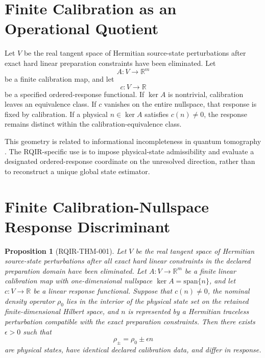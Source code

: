 \documentclass[11pt]{article}
\newtheorem{proposition}{Proposition}
\begin{document}
\section{Finite Calibration as an Operational Quotient}

Let $V$ be the real tangent space of Hermitian source-state perturbations after exact hard linear preparation constraints have been eliminated. Let
\begin{equation}
 A:V\rightarrow\mathbb R^m
\end{equation}
be a finite calibration map, and let
\begin{equation}
 c:V\rightarrow\mathbb R
\end{equation}
be a specified ordered-response functional. If $\ker A$ is nontrivial, calibration leaves an equivalence class. If $c$ vanishes on the entire nullspace, that response is fixed by calibration. If a physical $n\in\ker A$ satisfies $c(n)\neq0$, the response remains distinct within the calibration-equivalence class.

This geometry is related to informational incompleteness in quantum tomography \cite{DArianoParisSacchi2003,TeoRehacekHradil2013,GoncalvesEtAl2013,KalevKosutDeutsch2015}. The RQIR-specific use is to impose physical-state admissibility and evaluate a designated ordered-response coordinate on the unresolved direction, rather than to reconstruct a unique global state estimator.

\section{Finite Calibration-Nullspace Response Discriminant}

\begin{proposition}[RQIR-THM-001]\label{prop:rqir-thm-001}
Let $V$ be the real tangent space of Hermitian source-state perturbations after all exact hard linear constraints in the declared preparation domain have been eliminated. Let $A:V\to\mathbb R^m$ be a finite linear calibration map with one-dimensional nullspace $\ker A=\mathrm{span}\{n\}$, and let $c:V\to\mathbb R$ be a linear response functional. Suppose that $c(n)\neq0$, the nominal density operator $\rho_0$ lies in the interior of the physical state set on the retained finite-dimensional Hilbert space, and $n$ is represented by a Hermitian traceless perturbation compatible with the exact preparation constraints. Then there exists $\epsilon>0$ such that
\begin{equation}
 \rho_\pm=\rho_0\pm\epsilon n
\end{equation}
are physical states, have identical declared calibration data, and differ in response.
\end{proposition}
\end{document}
